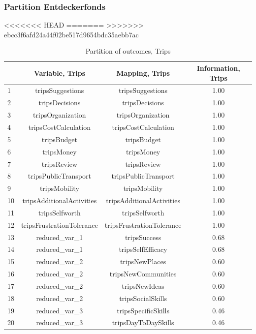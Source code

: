 \begin{frame}[fragile]
\begin{itemize}
\begin{frame}
\begin{itemize}
\begin{frame}
\frametitle{Partition Entdeckerfonds}
<<<<<<< HEAD
=======
>>>>>>> ebcc3f6afd24a44f02be517d9654bdc35aebb7ac
\begin{table}[ht]
\centering
\begin{tabular}{lccc}
  \hline
 & Variable, Trips & Mapping, Trips & Information, Trips \\ 
  \hline
1 & tripsSuggestions & tripsSuggestions & 1.00 \\ 
  2 & tripsDecisions & tripsDecisions & 1.00 \\ 
  3 & tripsOrganization & tripsOrganization & 1.00 \\ 
  4 & tripsCostCalculation & tripsCostCalculation & 1.00 \\ 
  5 & tripsBudget & tripsBudget & 1.00 \\ 
  6 & tripsMoney & tripsMoney & 1.00 \\ 
  7 & tripsReview & tripsReview & 1.00 \\ 
  8 & tripsPublicTransport & tripsPublicTransport & 1.00 \\ 
  9 & tripsMobility & tripsMobility & 1.00 \\ 
  10 & tripsAdditionalActivities & tripsAdditionalActivities & 1.00 \\ 
  11 & tripsSelfworth & tripsSelfworth & 1.00 \\ 
  12 & tripsFrustrationTolerance & tripsFrustrationTolerance & 1.00 \\ 
  13 & reduced\_var\_1 & tripsSuccess & 0.68 \\ 
  14 & reduced\_var\_1 & tripsSelfEfficacy & 0.68 \\ 
  15 & reduced\_var\_2 & tripsNewPlaces & 0.60 \\ 
  16 & reduced\_var\_2 & tripsNewCommunities & 0.60 \\ 
  17 & reduced\_var\_2 & tripsNewIdeas & 0.60 \\ 
  18 & reduced\_var\_2 & tripsSocialSkills & 0.60 \\ 
  19 & reduced\_var\_3 & tripsSpecificSkills & 0.46 \\ 
  20 & reduced\_var\_3 & tripsDayToDaySkills & 0.46 \\ 
   \hline
\end{tabular}
\caption{Partition of outcomes, Trips} 
\label{partitiontrips}
\end{table}


\end{frame}
\end{itemize}
\end{frame}
\end{itemize}
\end{frame}
